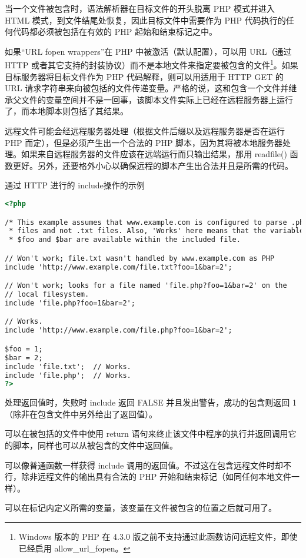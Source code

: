 当一个文件被包含时，语法解析器在目标文件的开头脱离 PHP 模式并进入 HTML 模式，到文件结尾处恢复，因此目标文件中需要作为 PHP 代码执行的任何代码都必须被包括在有效的 PHP 起始和结束标记之中。

如果“URL fopen wrappers”在 PHP 中被激活（默认配置），可以用 URL（通过 HTTP 或者其它支持的封装协议）而不是本地文件来指定要被包含的文件\footnote{Windows 版本的 PHP 在 4.3.0 版之前不支持通过此函数访问远程文件，即使已经启用 allow\_url\_fopen。}。如果目标服务器将目标文件作为 PHP 代码解释，则可以用适用于 HTTP GET 的 URL 请求字符串来向被包括的文件传递变量。严格的说，这和包含一个文件并继承父文件的变量空间并不是一回事，该脚本文件实际上已经在远程服务器上运行了，而本地脚本则包括了其结果。

远程文件可能会经远程服务器处理（根据文件后缀以及远程服务器是否在运行 PHP 而定），但是必须产生出一个合法的 PHP 脚本，因为其将被本地服务器处理。如果来自远程服务器的文件应该在远端运行而只输出结果，那用 readfile() 函数更好。另外，还要格外小心以确保远程的脚本产生出合法并且是所需的代码。

\begin{example}
通过 HTTP 进行的 include操作的示例
\begin{lstlisting}[language=HTML]
<?php

/* This example assumes that www.example.com is configured to parse .php *
 * files and not .txt files. Also, 'Works' here means that the variables *
 * $foo and $bar are available within the included file.                 */

// Won't work; file.txt wasn't handled by www.example.com as PHP
include 'http://www.example.com/file.txt?foo=1&bar=2';

// Won't work; looks for a file named 'file.php?foo=1&bar=2' on the
// local filesystem.
include 'file.php?foo=1&bar=2';

// Works.
include 'http://www.example.com/file.php?foo=1&bar=2';

$foo = 1;
$bar = 2;
include 'file.txt';  // Works.
include 'file.php';  // Works.
?>
\end{lstlisting}
\end{example}

处理返回值时，失败时 include 返回 FALSE 并且发出警告，成功的包含则返回 1（除非在包含文件中另外给出了返回值）。

\begin{compactitem}
\item 可以在被包括的文件中使用 return 语句来终止该文件中程序的执行并返回调用它的脚本，同样也可以从被包含的文件中返回值。
\item 可以像普通函数一样获得 include 调用的返回值。不过这在包含远程文件时却不行，除非远程文件的输出具有合法的 PHP 开始和结束标记（如同任何本地文件一样）。
\item 可以在标记内定义所需的变量，该变量在文件被包含的位置之后就可用了。
\end{compactitem}




